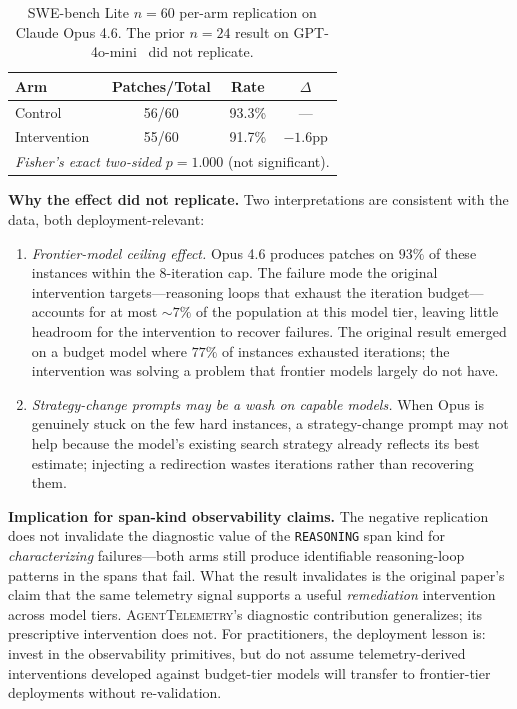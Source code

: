 \documentclass[11pt]{article}
\begin{document}
\begin{table}[t]
\centering
\small
\caption{SWE-bench Lite $n{=}60$ per-arm replication on Claude Opus 4.6.
The prior $n{=}24$ result on GPT-4o-mini~\citep{aiware2026} did not
replicate.}
\label{tab:n60}
\begin{tabular}{@{}lccc@{}}
\toprule
\textbf{Arm} & \textbf{Patches/Total} & \textbf{Rate} & \textbf{$\Delta$} \\
\midrule
Control       & 56/60 & 93.3\% & --- \\
Intervention  & 55/60 & 91.7\% & $-1.6$pp \\
\midrule
\multicolumn{4}{l}{\emph{Fisher's exact two-sided} $p{=}1.000$ (not significant).} \\
\bottomrule
\end{tabular}
\end{table}

\textbf{Why the effect did not replicate.} Two interpretations are
consistent with the data, both deployment-relevant:

\begin{enumerate}[leftmargin=*,nosep]
\item \emph{Frontier-model ceiling effect.} Opus 4.6 produces patches
  on $93\%$ of these instances within the 8-iteration cap. The
  failure mode the original intervention targets---reasoning loops
  that exhaust the iteration budget---accounts for at most $\sim{}7\%$
  of the population at this model tier, leaving little headroom for
  the intervention to recover failures. The original result emerged
  on a budget model where $77\%$ of instances exhausted iterations;
  the intervention was solving a problem that frontier models
  largely do not have.
\item \emph{Strategy-change prompts may be a wash on capable models.}
  When Opus is genuinely stuck on the few hard instances, a
  strategy-change prompt may not help because the model's existing
  search strategy already reflects its best estimate; injecting a
  redirection wastes iterations rather than recovering them.
\end{enumerate}

\textbf{Implication for span-kind observability claims.} The negative
replication does not invalidate the diagnostic value of the
\texttt{REASONING} span kind for \emph{characterizing} failures---both
arms still produce identifiable reasoning-loop patterns in the spans
that fail. What the result invalidates is the original paper's claim
that the same telemetry signal supports a useful \emph{remediation}
intervention across model tiers. \textsc{AgentTelemetry}'s diagnostic
contribution generalizes; its prescriptive intervention does not.
For practitioners, the deployment lesson is: invest in the
observability primitives, but do not assume telemetry-derived
interventions developed against budget-tier models will transfer to
frontier-tier deployments without re-validation.
\end{document}

